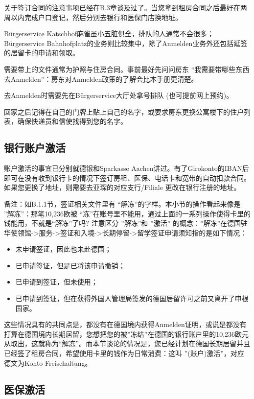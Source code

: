     关于签订合同的注意事项已经在B.3章谈及过了。当您拿到租房合同之后最好在两周以内完成户口登记，然后分别去银行和医保门店换地址。

    Bürgerservice Katschhof麻雀虽小五脏俱全，排队的人通常不会很多；Bürgerservice Bahnhofplatz的业务则比较集中，除了Anmelden业务外还包括延签的居留卡的申请和领取。

    需要带上的文件通常为护照与住房合同。事前最好先问问房东 “我需要带哪些东西去Anmelden”：房东对Anmelden政策的了解会比本手册更清楚。

    去Anmelden时需要先在Bürgerservice大厅处拿号排队 (也可提前网上预约)。

    回家之后记得在自己的门牌上贴上自己的名字，或要求房东更换公寓楼下的住户列表，确保快递员和信使找得到您的名字。

  \subsection{银行账户激活}\label{subsec:银行账户激活}

    账户激活的事宜已分别就德银和Sparkasse Aachen讲过。有了Girokonto的IBAN后即可在没有收到银行卡的情况下签订房租、医保、电话卡和宽带的自动扣款合同。如果您更换了地址，则需要去亚琛的对应支行/Filiale 更改在银行注册的地址。

    备注：如B.1.1节，签证相关文件里有 “解冻”的字样。本小节的操作看起来像是 ”解冻”：那笔10,236欧被 “冻”在账号里不能用，通过上面的一系列操作使得卡里的钱能用，不就是“解冻”了吗? 注意区分 ”解冻”和 ”激活” 的概念：”解冻”在德国驻华使领馆->服务->签证和入境->长期停留->留学签证申请须知指的是如下情况：
    \begin{itemize}
      \item 未申请签证，因此也未赴德国；
      \item 已申请签证，但是已将该申请撤销；
      \item 已申请到签证，但未使用；
      \item 已申请到签证，但在获得外国人管理局签发的德国居留许可之前又离开了申根国家。
    \end{itemize}

    这些情况具有的共同点是，都没有在德国境内获得Anmelden证明，或说是都没有打算在德国境内长期居留，您想把您的被”冻结”在德国的银行账户里的10,236欧元从取出，这就称为“解冻”。而本节谈论的情况是，您已经计划在德国长期居留并且已经签了租房合同，希望使用卡里的钱作为日常消费：这叫 ”(账户)激活”，对应德文为Konto Freischaltung。

  \subsection{医保激活}\label{subsec:医保激活}

